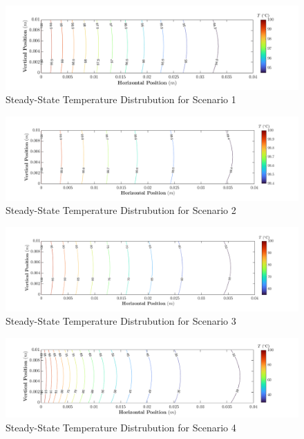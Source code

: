 \documentclass{article}
\begin{document}
\pagebreak

\begin{figure}[h]
    \centering
    \includegraphics[width=1\textwidth]{fig/contour1.png}
    \caption{Steady-State Temperature Distrubution for Scenario 1}
    \label{fig: Plot1}
\end{figure}

\pagebreak

\begin{figure}[h]
    \centering
    \includegraphics[width=1\textwidth]{fig/contour2.png}
    \caption{Steady-State Temperature Distrubution for Scenario 2}
    \label{fig: Plot2}
\end{figure}

\pagebreak

\begin{figure}[h]
    \centering
    \includegraphics[width=1\textwidth]{fig/contour3.png}
    \caption{Steady-State Temperature Distrubution for Scenario 3}
    \label{fig: Plot3}
\end{figure}

\pagebreak

\begin{figure}[h]
    \centering
    \includegraphics[width=1\textwidth]{fig/contour4.png}
    \caption{Steady-State Temperature Distrubution for Scenario 4}
    \label{fig: Plot4}
\end{figure}
\end{document}
